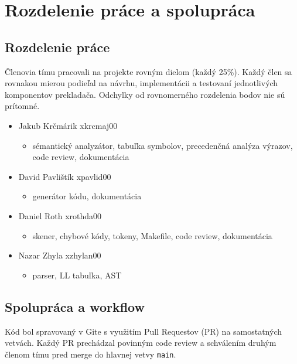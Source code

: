 \section{Rozdelenie práce a spolupráca}

\subsection{Rozdelenie práce}
Členovia tímu pracovali na projekte rovným dielom (každý 25\%). Každý člen sa rovnakou mierou podieľal na návrhu, implementácii a testovaní jednotlivých komponentov prekladača. Odchylky od rovnomerného rozdelenia bodov nie sú prítomné.
\begin{itemize}
    \item Jakub Krčmárik xkrcmaj00
    \begin{itemize}
        \item[--] sémantický analyzátor, tabuľka symbolov, precedenčná analýza výrazov, code review, dokumentácia
    \end{itemize}

    \item David Pavlištík xpavlid00
    \begin{itemize}
        \item[--] generátor kódu, dokumentácia
    \end{itemize}

    \item Daniel Roth xrothda00
    \begin{itemize}
        \item[--] skener, chybové kódy, tokeny, Makefile, code review, dokumentácia
    \end{itemize}

    \item Nazar Zhyla xzhylan00
    \begin{itemize}
        \item[--] parser, LL tabuľka, AST
    \end{itemize}


\end{itemize}

\subsection{Spolupráca a workflow}
Kód bol spravovaný v Gite s využitím Pull Requestov (PR) na samostatných vetvách. Každý PR prechádzal povinným code review a schválením druhým členom tímu pred merge do hlavnej vetvy \texttt{main}.

